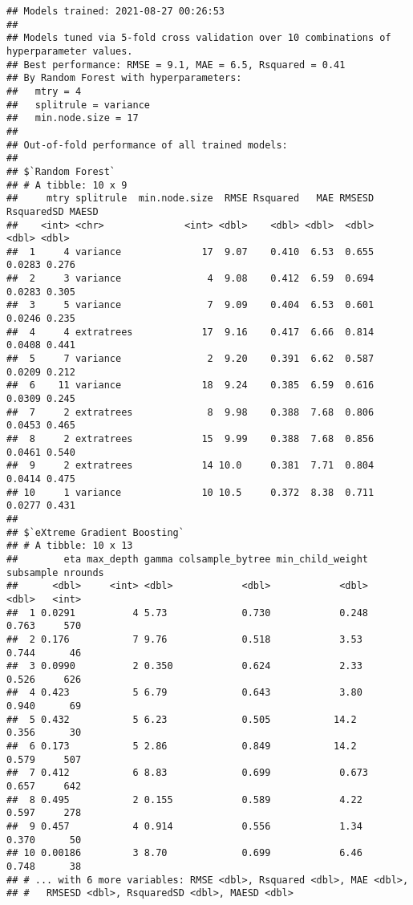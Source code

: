 \documentclass[
]{article}
\begin{document}
\begin{verbatim}
## Models trained: 2021-08-27 00:26:53
## 
## Models tuned via 5-fold cross validation over 10 combinations of hyperparameter values.
## Best performance: RMSE = 9.1, MAE = 6.5, Rsquared = 0.41
## By Random Forest with hyperparameters:
##   mtry = 4
##   splitrule = variance
##   min.node.size = 17
## 
## Out-of-fold performance of all trained models:
## 
## $`Random Forest`
## # A tibble: 10 x 9
##     mtry splitrule  min.node.size  RMSE Rsquared   MAE RMSESD RsquaredSD MAESD
##    <int> <chr>              <int> <dbl>    <dbl> <dbl>  <dbl>      <dbl> <dbl>
##  1     4 variance              17  9.07    0.410  6.53  0.655     0.0283 0.276
##  2     3 variance               4  9.08    0.412  6.59  0.694     0.0283 0.305
##  3     5 variance               7  9.09    0.404  6.53  0.601     0.0246 0.235
##  4     4 extratrees            17  9.16    0.417  6.66  0.814     0.0408 0.441
##  5     7 variance               2  9.20    0.391  6.62  0.587     0.0209 0.212
##  6    11 variance              18  9.24    0.385  6.59  0.616     0.0309 0.245
##  7     2 extratrees             8  9.98    0.388  7.68  0.806     0.0453 0.465
##  8     2 extratrees            15  9.99    0.388  7.68  0.856     0.0461 0.540
##  9     2 extratrees            14 10.0     0.381  7.71  0.804     0.0414 0.475
## 10     1 variance              10 10.5     0.372  8.38  0.711     0.0277 0.431
## 
## $`eXtreme Gradient Boosting`
## # A tibble: 10 x 13
##        eta max_depth gamma colsample_bytree min_child_weight subsample nrounds
##      <dbl>     <int> <dbl>            <dbl>            <dbl>     <dbl>   <int>
##  1 0.0291          4 5.73             0.730            0.248     0.763     570
##  2 0.176           7 9.76             0.518            3.53      0.744      46
##  3 0.0990          2 0.350            0.624            2.33      0.526     626
##  4 0.423           5 6.79             0.643            3.80      0.940      69
##  5 0.432           5 6.23             0.505           14.2       0.356      30
##  6 0.173           5 2.86             0.849           14.2       0.579     507
##  7 0.412           6 8.83             0.699            0.673     0.657     642
##  8 0.495           2 0.155            0.589            4.22      0.597     278
##  9 0.457           4 0.914            0.556            1.34      0.370      50
## 10 0.00186         3 8.70             0.699            6.46      0.748      38
## # ... with 6 more variables: RMSE <dbl>, Rsquared <dbl>, MAE <dbl>,
## #   RMSESD <dbl>, RsquaredSD <dbl>, MAESD <dbl>

\end{verbatim}
\end{document}

